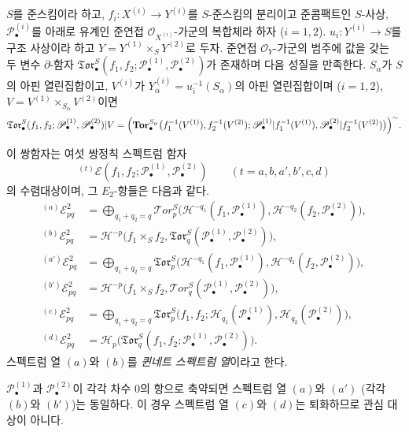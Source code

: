 \begin{theorem}[6.7.3]
\label{III.6.7.3-fr}
$S$를 준스킴이라 하고, $f_i:X^{(i)}\to Y^{(i)}$를 $S$-준스킴의
분리이고 준콤팩트인 $S$-사상, $\mathscr P_\bullet^{(i)}$를 아래로
유계인 준연접 $\mathscr O_{X^{(i)}}$-가군의 복합체라 하자
($i=1,2$). $u_i:Y^{(i)}\to S$를 구조 사상이라 하고
$Y=Y^{(1)}\times_S Y^{(2)}$로 두자. 준연접
$\mathscr O_Y$-가군의 범주에 값을 갖는 두 변수 $\partial$-함자
$\mathfrak{Tor}_\bullet^S
(f_1,f_2;\mathscr P_\bullet^{(1)},\mathscr P_\bullet^{(2)})$가 존재하며
다음 성질을 만족한다. $S_\alpha$가 $S$의 아핀 열린집합이고,
$V^{(i)}$가 $Y_\alpha^{(i)}=u_i^{-1}(S_\alpha)$의 아핀 열린집합이며
($i=1,2$), $V=V^{(1)}\times_{S_\alpha}V^{(2)}$이면
\[
  \mathfrak{Tor}_\bullet^S
  (f_1,f_2;\mathscr P_\bullet^{(1)},\mathscr P_\bullet^{(2)})|V
  =\Bigl(\mathbf{Tor}_\bullet^{S_\alpha}
    \bigl(f_1^{-1}(V^{(1)}),f_2^{-1}(V^{(2)});
      \mathscr P_\bullet^{(1)}|f_1^{-1}(V^{(1)}),
      \mathscr P_\bullet^{(2)}|f_2^{-1}(V^{(2)})\bigr)\Bigr)^{\sim}.
\]


이 쌍함자는 여섯 쌍정칙 스펙트럼 함자
\[
  {}^{(t)}\mathscr E
  (f_1,f_2;\mathscr P_\bullet^{(1)},\mathscr P_\bullet^{(2)})
  \qquad(t=a,b,a',b',c,d)
\]
의 수렴대상이며, 그 $E_2$-항들은 다음과 같다.
\[
\begin{aligned}
  {}^{(a)}\mathscr E_{pq}^2
  &=\bigoplus_{q_1+q_2=q}
    \mathscr{T}\!or_p^S
    \bigl(\mathscr H^{-q_1}(f_1,\mathscr P_\bullet^{(1)}),
          \mathscr H^{-q_2}(f_2,\mathscr P_\bullet^{(2)})\bigr),\\
  {}^{(b)}\mathscr E_{pq}^2
  &=\mathscr H^{-p}\bigl(f_1\times_S f_2,
    \mathfrak{Tor}_q^S
    (\mathscr P_\bullet^{(1)},\mathscr P_\bullet^{(2)})\bigr),\\
  {}^{(a')}\mathscr E_{pq}^2
  &=\bigoplus_{q_1+q_2=q}
    \mathfrak{Tor}_p^S
    \bigl(\mathscr H^{-q_1}(f_1,\mathscr P_\bullet^{(1)}),
          \mathscr H^{-q_2}(f_2,\mathscr P_\bullet^{(2)})\bigr),\\
  {}^{(b')}\mathscr E_{pq}^2
  &=\mathscr H^{-p}\bigl(f_1\times_S f_2,
    \mathscr{T}\!or_q^S
    (\mathscr P_\bullet^{(1)},\mathscr P_\bullet^{(2)})\bigr),\\
  {}^{(c)}\mathscr E_{pq}^2
  &=\bigoplus_{q_1+q_2=q}
    \mathfrak{Tor}_p^S
    \bigl(f_1,f_2;
      \mathscr H_{q_1}(\mathscr P_\bullet^{(1)}),
      \mathscr H_{q_2}(\mathscr P_\bullet^{(2)})\bigr),\\
  {}^{(d)}\mathscr E_{pq}^2
  &=\mathscr H_p\bigl(\mathfrak{Tor}_q^S
    (f_1,f_2;\mathscr P_\bullet^{(1)},\mathscr P_\bullet^{(2)})\bigr).
\end{aligned}
\]
스펙트럼 열 $(a)$와 $(b)$를 \emph{퀸네트 스펙트럼 열}이라고 한다.

$\mathscr P_\bullet^{(1)}$과 $\mathscr P_\bullet^{(2)}$이 각각 차수
0의 항으로 축약되면 스펙트럼 열 $(a)$와 $(a')$ (각각 $(b)$와
$(b')$)는 동일하다. 이 경우 스펙트럼 열 $(c)$와 $(d)$는 퇴화하므로
관심 대상이 아니다.
\end{theorem}

